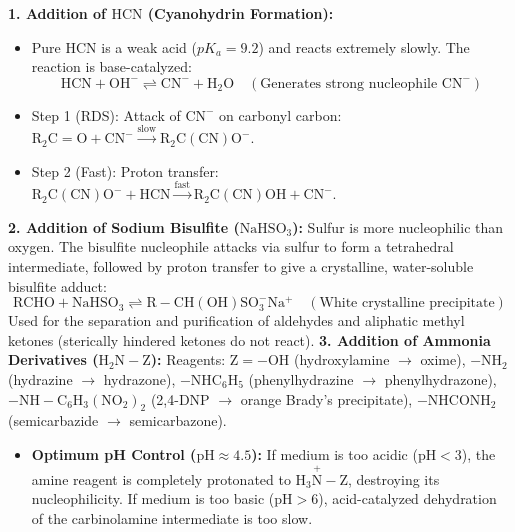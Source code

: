 \documentclass[10pt,twoside,openright]{book}
\begin{document}
\begin{formulabox}
\textbf{1. Addition of $\mathrm{HCN}$ (Cyanohydrin Formation):}
\begin{itemize}
  \item Pure $\mathrm{HCN}$ is a weak acid ($pK_a = 9.2$) and reacts extremely slowly. The reaction is base-catalyzed:
  \begin{equation}
    \mathrm{HCN} + \mathrm{OH^-} \rightleftharpoons \mathrm{CN^-} + \mathrm{H_2O} \quad (\text{Generates strong nucleophile } \mathrm{CN^-})
  \end{equation}
  \item Step 1 (RDS): Attack of $\mathrm{CN^-}$ on carbonyl carbon: $\mathrm{R_2C=O} + \mathrm{CN^-} \xrightarrow{\text{slow}} \mathrm{R_2C(CN)O^-}$.
  \item Step 2 (Fast): Proton transfer: $\mathrm{R_2C(CN)O^-} + \mathrm{HCN} \xrightarrow{\text{fast}} \mathrm{R_2C(CN)OH} + \mathrm{CN^-}$.
\end{itemize}
\textbf{2. Addition of Sodium Bisulfite ($\mathrm{NaHSO_3}$):}
Sulfur is more nucleophilic than oxygen. The bisulfite nucleophile attacks via sulfur to form a tetrahedral intermediate, followed by proton transfer to give a crystalline, water-soluble bisulfite adduct:
\begin{equation}
  \mathrm{RCHO} + \mathrm{NaHSO_3} \rightleftharpoons \mathrm{R-CH(OH)SO_3^-Na^+} \quad (\text{White crystalline precipitate})
\end{equation}
Used for the separation and purification of aldehydes and aliphatic methyl ketones (sterically hindered ketones do not react).
\textbf{3. Addition of Ammonia Derivatives ($\mathrm{H_2N-Z}$):}
Reagents: $\mathrm{Z = -OH}$ (hydroxylamine $\to$ oxime), $-\mathrm{NH_2}$ (hydrazine $\to$ hydrazone), $-\mathrm{NHC_6H_5}$ (phenylhydrazine $\to$ phenylhydrazone), $-\mathrm{NH-C_6H_3(NO_2)_2}$ (2,4-DNP $\to$ orange Brady's precipitate), $-\mathrm{NHCONH_2}$ (semicarbazide $\to$ semicarbazone).
\begin{itemize}
  \item \textbf{Optimum pH Control ($\mathrm{pH} \approx 4.5$):} If medium is too acidic ($\mathrm{pH} < 3$), the amine reagent is completely protonated to $\mathrm{H_3\overset{+}{N}-Z}$, destroying its nucleophilicity. If medium is too basic ($\mathrm{pH} > 6$), acid-catalyzed dehydration of the carbinolamine intermediate is too slow.
\end{itemize}
\end{formulabox}
\end{document}
